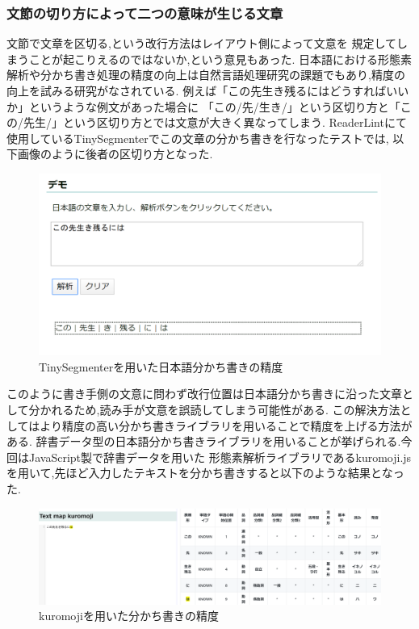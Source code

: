 \subsubsection{文節の切り方によって二つの意味が生じる文章}
文節で文章を区切る,という改行方法はレイアウト側によって文意を
規定してしまうことが起こりえるのではないか,という意見もあった.
日本語における形態素解析や分かち書き処理の精度の向上は自然言語処理研究の課題でもあり,精度の向上を試みる研究がなされている.
例えば「この先生き残るにはどうすればいいか」というような例文があった場合に
「この/先/生き/」という区切り方と「この/先生/」という区切り方とでは文意が大きく異なってしまう.
ReaderLintにて使用しているTinySegmenterでこの文章の分かち書きを行なったテストでは,
以下画像のように後者の区切り方となった.
\begin{figure}[H]
    \centering
    \label{fig:image9}
    \includegraphics[width=0.7\columnwidth]{image/04/img2.png}
    \caption[TinySegmenterを用いた日本語分かち書きの精度] {TinySegmenterを用いた日本語分かち書きの精度}\footnotemark[1]
\end{figure}

このように書き手側の文意に問わず改行位置は日本語分かち書きに沿った文章として分かれるため,読み手が文意を誤読してしまう可能性がある.
この解決方法としてはより精度の高い分かち書きライブラリを用いることで精度を上げる方法がある.
辞書データ型の日本語分かち書きライブラリを用いることが挙げられる.今回はJavaScript製で辞書データを用いた
形態素解析ライブラリであるkuromoji.jsを用いて,先ほど入力したテキストを分かち書きすると以下のような結果となった.
\begin{figure}[H]
    \centering
    \label{fig:image9}
    \includegraphics[width=0.7\columnwidth]{image/04/img3.png}
    \caption[kuromojiを用いた分かち書きの精度] {kuromojiを用いた分かち書きの精度}\footnotemark[2]
\end{figure}

